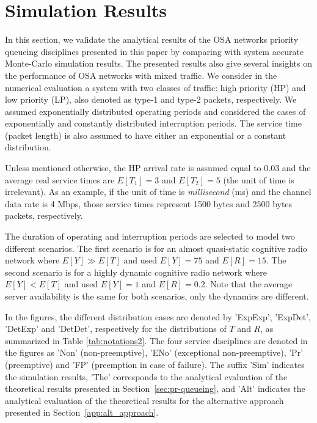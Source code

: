 \documentclass[11pt,journal,oneside,onecolumn,draftclsnofoot]{IEEEtran}
\begin{document}
\section{Simulation Results}
\label{sec:sim-analysis}
In this section, we validate the analytical results of the OSA networks priority queueing disciplines presented in this paper by comparing with system accurate Monte-Carlo simulation results. The presented results also give several insights on the performance of OSA networks with mixed traffic.
We consider in the numerical evaluation a system with two classes of traffic: high priority (HP) and low priority (LP), also denoted as type-1 and type-2 packets, respectively. We assumed exponentially distributed operating periods and considered the cases of exponentially and constantly distributed interruption periods. 
The service time (packet length) is also assumed to have either an exponential or a constant distribution. 

Unless mentioned otherwise, the HP arrival rate is assumed  equal to 0.03 and the average real service times are $E[T_1]=3$ and $E[T_2]=5$ (the unit of time is irrelevant). As an example, if the unit of time is \emph{millisecond} (ms) and the channel data rate is 4 Mbps, those service times represent 1500 bytes and 2500 bytes packets, respectively.

The duration of operating and interruption periods are selected to model two different scenarios. The first scenario is for an almost quasi-static cognitive radio network where $E[Y]\gg E[T]$ and used $E[Y]=75$ and $E[R]=15$.
The second scenario is for a highly dynamic cognitive radio network \cite{khalife09} where $E[Y]<E[T]$ and used $E[Y]=1$ and $E[R]=0.2$. Note that the average server availability is the same for both scenarios, only the dynamics are different.

In the figures, the different distribution cases are denoted by 'ExpExp', 'ExpDet', 'DetExp' and 'DetDet', respectively for the distributions of $T$ and $R$, as summarized in Table \ref{tab:notations2}. The four service disciplines are denoted in the figures as 'Non' (non-preemptive), 'ENo' (exceptional non-preemptive), 'Pr' (preemptive) and 'FP' (preemption in case of failure). The suffix 'Sim' indicates the simulation results, 'The' corresponds to the analytical evaluation of the theoretical results presented in Section~\ref{sec:pr-queueing}, and 'Alt' indicates the analytical evaluation of the theoretical results for the alternative approach presented in Section~\ref{app:alt_approach}.
\end{document}

